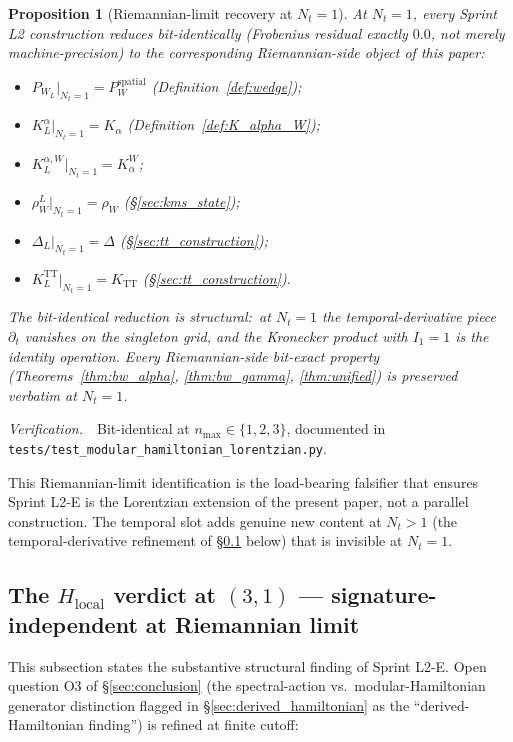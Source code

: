 \documentclass[11pt,a4paper]{article}
\theoremstyle{plain}
\newtheorem{proposition}[theorem]{Proposition}
\theoremstyle{definition}
\begin{document}
\begin{proposition}[Riemannian-limit recovery at $N_t = 1$]
\label{prop:riemannian_limit_l2}
At $N_t = 1$, every Sprint L2 construction reduces bit-identically
(Frobenius residual exactly $0.0$, not merely machine-precision)
to the corresponding Riemannian-side object of this paper:
\begin{itemize}\setlength{\itemsep}{2pt}
\item $P_{W_L}|_{N_t=1} = P_W^{\mathrm{spatial}}$ (Definition~\ref{def:wedge});
\item $K_L^\alpha|_{N_t=1} = K_\alpha$ (Definition~\ref{def:K_alpha_W});
\item $K_L^{\alpha, W}|_{N_t=1} = K_\alpha^W$;
\item $\rho_W^L|_{N_t=1} = \rho_W$ (\S\ref{sec:kms_state});
\item $\Delta_L|_{N_t=1} = \Delta$ (\S\ref{sec:tt_construction});
\item $K_L^{\mathrm{TT}}|_{N_t=1} = K_{\mathrm{TT}}$ (\S\ref{sec:tt_construction}).
\end{itemize}
The bit-identical reduction is structural:\ at $N_t = 1$ the
temporal-derivative piece $\partial_t$ vanishes on the singleton
grid, and the Kronecker product with $I_1 = 1$ is the identity
operation.  Every Riemannian-side bit-exact property (Theorems~\ref{thm:bw_alpha},
\ref{thm:bw_gamma}, \ref{thm:unified}) is preserved verbatim at
$N_t = 1$.
\end{proposition}

\emph{Verification.}\ \ Bit-identical at $n_{\max} \in \{1, 2, 3\}$,
documented in \texttt{tests/test\_modular\_hamiltonian\_lorentzian.py}.

This Riemannian-limit identification is the load-bearing falsifier
that ensures Sprint L2-E is the Lorentzian extension of the present
paper, not a parallel construction.  The temporal slot adds genuine
new content at $N_t > 1$ (the temporal-derivative refinement of
\S\ref{sec:h_local_signature_independent} below) that is invisible at
$N_t = 1$.

\subsection{The $H_{\mathrm{local}}$ verdict at $(3, 1)$ —
signature-independent at Riemannian limit}
\label{sec:h_local_signature_independent}

This subsection states the substantive structural finding of
Sprint L2-E.  Open question O3 of \S\ref{sec:conclusion} (the
spectral-action vs.\ modular-Hamiltonian generator distinction
flagged in \S\ref{sec:derived_hamiltonian} as the
``derived-Hamiltonian finding'') is refined at finite cutoff:
\end{document}
